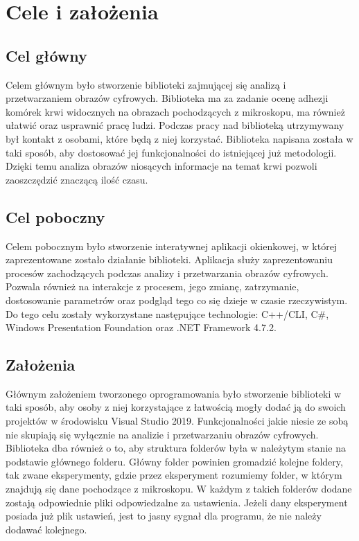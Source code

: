 \documentclass{article}
\begin{document}
    \vfill

    \newpage
    \section{Cele i założenia}
        \subsection{Cel główny}
        {
            \Large
            \justifying
            \quad
            Celem głównym było stworzenie biblioteki zajmującej się analizą i przetwarzaniem obrazów cyfrowych.
            Biblioteka ma za zadanie ocenę adhezji komórek krwi widocznych na obrazach pochodzących z mikroskopu, ma również ułatwić oraz usprawnić pracę ludzi.
            Podczas pracy nad biblioteką utrzymywany był kontakt z osobami, które będą z niej korzystać.
            Biblioteka napisana została w taki sposób, aby dostosować jej funkcjonalności do istniejącej już metodologii.
            Dzięki temu analiza obrazów niosących informacje na temat krwi pozwoli zaoszczędzić znaczącą ilość czasu.
        }
        \subsection {Cel poboczny}
        {
            \Large
            \justifying
            \quad
            Celem pobocznym było stworzenie interatywnej aplikacji okienkowej, w której zaprezentowane zostało działanie biblioteki.
            Aplikacja służy zaprezentowaniu procesów zachodzących podczas analizy i przetwarzania obrazów cyfrowych.
            Pozwala również na interakcje z procesem, jego zmianę, zatrzymanie, dostosowanie parametrów oraz podgląd tego co się dzieje w czasie rzeczywistym.
            Do tego celu zostały wykorzystane następujące technologie: C++/CLI, C\#, Windows Presentation Foundation oraz .NET Framework 4.7.2.
        }
        \subsection{Założenia}
        {
            \Large
            \justifying
            \quad
            Głównym założeniem tworzonego oprogramowania było stworzenie biblioteki w taki sposób, aby osoby z niej korzystające z łatwością mogły dodać ją do swoich projektów w środowisku Visual Studio 2019.
            Funkcjonalności jakie niesie ze sobą nie skupiają się wyłącznie na analizie i przetwarzaniu obrazów cyfrowych.
            Biblioteka dba również o to, aby struktura folderów była w należytym stanie na podstawie głównego folderu.
            Główny folder powinien gromadzić kolejne foldery, tak zwane eksperymenty, gdzie przez eksperyment rozumiemy folder, w którym znajdują się dane pochodzące z mikroskopu.
            W każdym z takich folderów dodane zostają odpowiednie pliki odpowiedzalne za ustawienia.
            Jeżeli dany eksperyment posiada już plik ustawień, jest to jasny sygnał dla programu, że nie należy dodawać kolejnego.
        }
\end{document}
